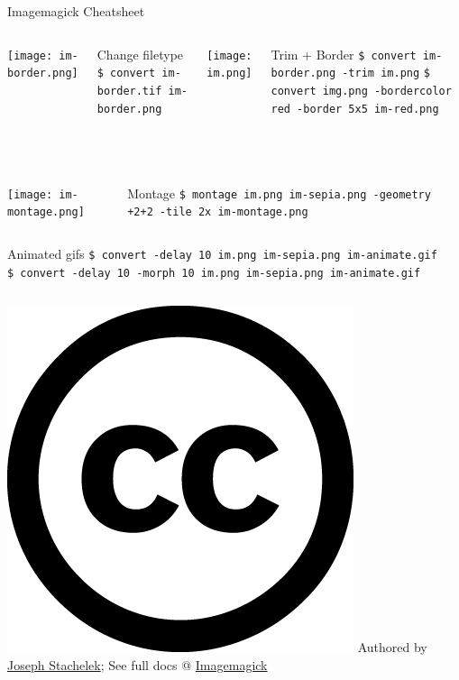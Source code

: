 \documentclass[hyperref={colorlinks,citecolor=pink,linkcolor=red,urlcolor=blue}]{beamer}
\newcommand\Fontvii{\fontsize{7pt}{7.2}\selectfont}
\begin{document}
\begin{frame}{Imagemagick Cheatsheet}
\Fontvii


\begin{minipage}[0.2\textheight]{\textwidth}
	\begin{columns}[T]
			\texttt{[image: im-border.png]}\\
			\begin{exampleblock}{Change filetype}
				\texttt{\$ convert im-border.tif im-border.png}
			\end{exampleblock}	
			\texttt{[image: im.png]}\\
			\begin{exampleblock}{Trim + Border}
				\texttt{\$ convert im-border.png -trim im.png}
				\texttt{\$ convert img.png -bordercolor red -border 5x5 im-red.png}
			\end{exampleblock}	
	\end{columns}
\end{minipage}\\


\begin{minipage}[0.2\textheight]{\textwidth}
	\begin{columns}[T]
			\texttt{[image: im-montage.png]}\\
			\begin{exampleblock}{Montage}
				\texttt{\$ montage im.png im-sepia.png -geometry +2+2 -tile 2x im-montage.png}\\
			\end{exampleblock}	
	\end{columns}
\end{minipage}


\begin{minipage}[0.2\textheight]{\textwidth}
	\begin{columns}[T]
			\begin{exampleblock}{Animated gifs}
				\texttt{\$ convert -delay 10 im.png im-sepia.png im-animate.gif}\\
				\texttt{\$ convert -delay 10 -morph 10 im.png im-sepia.png im-animate.gif}
			\end{exampleblock}	
	\end{columns}
\end{minipage}


\includegraphics[height=.15in]{cc.large.png} Authored by \href{http://jsta.github.io}{Joseph Stachelek}; See full docs @
\href{http://www.imagemagick.org}{Imagemagick}
\end{frame}
\end{document}
